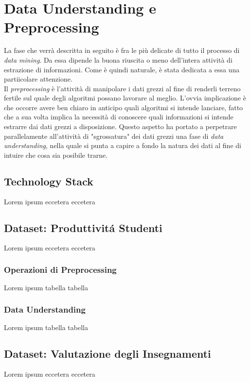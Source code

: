 \chapter{Data Understanding e Preprocessing}

La fase che verrà descritta in seguito è fra le più delicate di tutto il processo di \textit{data mining}. Da essa dipende la buona riuscita o meno dell'intera attività di estrazione di informazioni. Come è quindi naturale, è stata dedicata a essa una partiicolare attenzione. \\

Il \textit{preprocessing} è l'attività di manipolare i dati grezzi al fine di renderli terreno fertile sul quale degli algoritmi possano lavorare al meglio. L'ovvia implicazione è che occorre avere ben chiaro in anticipo quali algoritmi si intende lanciare, fatto che a sua volta implica la necessità di conoscere quali informazioni si intende estrarre dai dati grezzi a disposizione. Questo aspetto ha portato a perpetrare parallelamente all'attività di "sgrossatura" dei dati grezzi una fase di \textit{data understanding}, nella quale si punta a capire a fondo la natura dei dati al fine di intuire che cosa sia posibile trarne.

\section{Technology Stack}
	Lorem ipsum eccetera eccetera  

\section{Dataset: Produttivit\'a Studenti}
	Lorem ipsum eccetera eccetera  

	\subsection{Operazioni di Preprocessing}
		Lorem ipsum tabella tabella

	\subsection{Data Understanding}
		Lorem ipsum tabella tabella
	
\section{Dataset: Valutazione degli Insegnamenti}
	Lorem ipsum eccetera eccetera  

